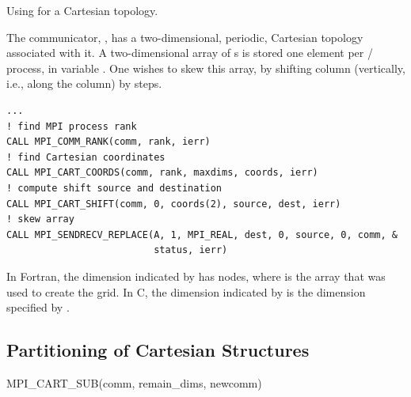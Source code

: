 \begin{example}
\label{topol-exD}
%
Using  for a Cartesian topology.

The communicator, , has a two-dimensional, periodic, Cartesian
topology associated with it.  A two-dimensional array of s is stored
one element per \MPI/ process, in variable .  One wishes to skew this array,
by shifting column  (vertically, i.e., along the column) by
 steps.
\begin{lstlisting}[language={[MPI]Fortran}]
...
! find MPI process rank
CALL MPI_COMM_RANK(comm, rank, ierr)
! find Cartesian coordinates
CALL MPI_CART_COORDS(comm, rank, maxdims, coords, ierr)
! compute shift source and destination
CALL MPI_CART_SHIFT(comm, 0, coords(2), source, dest, ierr)
! skew array
CALL MPI_SENDRECV_REPLACE(A, 1, MPI_REAL, dest, 0, source, 0, comm, &
                          status, ierr)
\end{lstlisting}
\end{example}

\begin{users}
In Fortran, the dimension indicated by  has\flushline
{} nodes, where
 is the array that
was used to create the grid.  In C, the dimension
indicated by  is the dimension specified by
.
\end{users}

\subsection{Partitioning of Cartesian Structures}
\label{subsec:topol-part}

\begin{funcdef}{MPI\_CART\_SUB}{(\mbox{comm}, \mbox{remain\_dims}, \mbox{newcomm})}
\end{funcdef}


